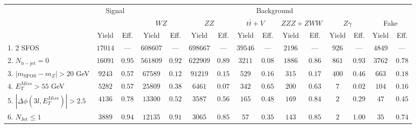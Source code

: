 \begin{tabular}{l||c|c||c|c||c|c||c|c||c|c||c|c||c|c}
\hline
 &\multicolumn{2}{c||}{Signal}            &  \multicolumn{12}{c}{Background}  \\
 & &  & \multicolumn{2}{c||}{$WZ$} & \multicolumn{2}{c||}{$ZZ$} & \multicolumn{2}{c||}{$t\bar{t}+V$} & \multicolumn{2}{c||}{$ZZZ+ZWW$} & \multicolumn{2}{c||}{$Z\gamma$} & \multicolumn{2}{c}{Fake}  \\ 
 & Yield & Eff. & Yield & Eff. & Yield & Eff. & Yield & Eff. & Yield & Eff. & Yield & Eff. & Yield & Eff. \\
\hline\hline
1. 2 SFOS &  $17014$ &  --- &  $608607$ &  --- &  $698667$ &  --- &  $39546$ &  --- &  $2196$ &  --- &  $926$ &  --- &  $4849$ &  ---\\ 
\hline
2. $N_{\mathrm{b-jet}}=0$ &  $16091$ &  $0.95$ &  $561809$ &  $0.92$ &  $622909$ &  $0.89$ &  $3211$ &  $0.08$ &  $1886$ &  $0.86$ &  $861$ &  $0.93$ &  $3762$ &  $0.78$\\ 
\hline
3. $| m_{\mathrm{SFOS}} - m_Z | >  20$ GeV &  $9243$ &  $0.57$ &  $67589$ &  $0.12$ &  $91219$ &  $0.15$ &  $529$ &  $0.16$ &  $315$ &  $0.17$ &  $400$ &  $0.46$ &  $663$ &  $0.18$\\ 
\hline
4. $E_{T}^{Miss} > 55$ GeV &  $5282$ &  $0.57$ &  $25809$ &  $0.38$ &  $6461$ &  $0.07$ &  $342$ &  $0.65$ &  $200$ &  $0.63$ &  $7$ &  $0.02$ &  $104$ &  $0.16$\\ 
\hline
5. $|\Delta\phi(3l,E_{T}^{Miss})| > 2.5$ &  $4136$ &  $0.78$ &  $13300$ &  $0.52$ &  $3587$ &  $0.56$ &  $165$ &  $0.48$ &  $169$ &  $0.84$ &  $2$ &  $0.29$ &  $47$ &  $0.45$\\ 
\hline
6. $N_{\mathrm{Jet}} \leq 1$ &  $3889$ &  $0.94$ &  $12135$ &  $0.91$ &  $3065$ &  $0.85$ &  $57$ &  $0.35$ &  $143$ &  $0.85$ &  $2$ &  $1.00$ &  $35$ &  $0.74$\\ 
\hline
\end{tabular}
